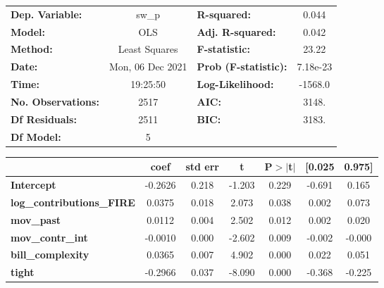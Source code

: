 \begin{center}
\begin{tabular}{lclc}
\toprule
\textbf{Dep. Variable:}           &      sw\_p       & \textbf{  R-squared:         } &     0.044   \\
\textbf{Model:}                   &       OLS        & \textbf{  Adj. R-squared:    } &     0.042   \\
\textbf{Method:}                  &  Least Squares   & \textbf{  F-statistic:       } &     23.22   \\
\textbf{Date:}                    & Mon, 06 Dec 2021 & \textbf{  Prob (F-statistic):} &  7.18e-23   \\
\textbf{Time:}                    &     19:25:50     & \textbf{  Log-Likelihood:    } &   -1568.0   \\
\textbf{No. Observations:}        &        2517      & \textbf{  AIC:               } &     3148.   \\
\textbf{Df Residuals:}            &        2511      & \textbf{  BIC:               } &     3183.   \\
\textbf{Df Model:}                &           5      & \textbf{                     } &             \\
\bottomrule
\end{tabular}
\begin{tabular}{lcccccc}
                                  & \textbf{coef} & \textbf{std err} & \textbf{t} & \textbf{P$> |$t$|$} & \textbf{[0.025} & \textbf{0.975]}  \\
\midrule
\textbf{Intercept}                &      -0.2626  &        0.218     &    -1.203  &         0.229        &       -0.691    &        0.165     \\
\textbf{log\_contributions\_FIRE} &       0.0375  &        0.018     &     2.073  &         0.038        &        0.002    &        0.073     \\
\textbf{mov\_past}                &       0.0112  &        0.004     &     2.502  &         0.012        &        0.002    &        0.020     \\
\textbf{mov\_contr\_int}          &      -0.0010  &        0.000     &    -2.602  &         0.009        &       -0.002    &       -0.000     \\
\textbf{bill\_complexity}         &       0.0365  &        0.007     &     4.902  &         0.000        &        0.022    &        0.051     \\
\textbf{tight}                    &      -0.2966  &        0.037     &    -8.090  &         0.000        &       -0.368    &       -0.225     \\

\end{tabular}
\end{center}
